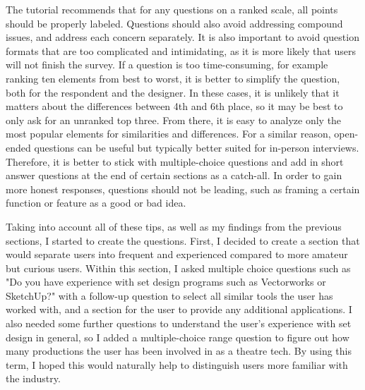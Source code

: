 \documentclass[10pt,twocolumn]{article}
\begin{document}
The tutorial recommends that for any questions on a ranked scale, all points should be properly labeled. Questions should also avoid addressing compound issues, and address each concern separately. It is also important to avoid question formats that are too complicated and intimidating, as it is more likely that users will not finish the survey. If a question is too time-consuming, for example ranking ten elements from best to worst, it is better to simplify the question, both for the respondent and the designer. In these cases, it is unlikely that it matters about the differences between 4th and 6th place, so it may be best to only ask for an unranked top three. From there, it is easy to analyze only the most popular elements for similarities and differences. For a similar reason, open-ended questions can be useful but typically better suited for in-person interviews. Therefore, it is better to stick with multiple-choice questions and add in short answer questions at the end of certain sections as a catch-all. In order to gain more honest responses, questions should not be leading, such as framing a certain function or feature as a good or bad idea. 

Taking into account all of these tips, as well as my findings from the previous sections, I started to create the questions. First, I decided to create a section that would separate users into frequent and experienced compared to more amateur but curious users. Within this section, I asked multiple choice questions such as "Do you have experience with set design programs such as Vectorworks or SketchUp?" with a follow-up question to select all similar tools the user has worked with, and a section for the user to provide any additional applications. I also needed some further questions to understand the user's experience with set design in general, so I added a multiple-choice range question to figure out how many productions the user has been involved in as a theatre tech. By using this term, I hoped this would naturally help to distinguish users more familiar with the industry. 
\end{document}
